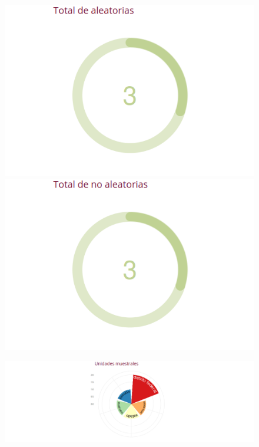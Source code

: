 \documentclass[10,a4paperpaper,]{article}
\begin{document}
\begin{figure}[!htb]
  \begin{minipage}{0.5\textwidth}
    \centering
    \includegraphics[width=1.1\linewidth]{figures/aleatorias.png}
  \end{minipage}\hfill
  \begin{minipage}{0.5\textwidth}
    \centering
    \includegraphics[width=1.1\linewidth]{figures/noaleatorias.png}
  \end{minipage}
\end{figure}

\begin{figure}[!htb]
  \centering
  \includegraphics[width=1.2\linewidth]{figures/unidadesmuestral.png}   
\end{figure}
\end{document}
